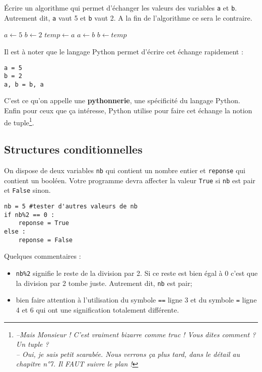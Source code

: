\begin{cor}
\begin{multicols}{2}
Écrire un algorithme qui permet d'échanger les valeurs des variables \texttt{a} et \texttt{b}.\\
Autrement dit, \texttt{a} vaut 5 et \texttt{b} vaut 2. A la fin de l'algorithme ce sera le contraire.\\

\columnbreak
\begin{algorithm}[H]
$a \leftarrow 5$ \;
$b \leftarrow 2$ \;
$temp \leftarrow a$ \;
$a \leftarrow b$ \;
$b \leftarrow temp$ \;
\end{algorithm}
\end{multicols}
Il est à noter que le langage Python permet d'écrire cet échange rapidement :
\begin{lstlisting}
a = 5
b = 2
a, b = b, a
\end{lstlisting}
C'est ce qu'on appelle une \textbf{pythonnerie}, une spécificité du langage Python. Enfin pour ceux que ça intéresse, Python utilise pour faire cet échange la notion de tuple\footnote{\textit{--Mais Monsieur ! C'est vraiment bizarre comme truc ! Vous dites comment ? Un tuple ?\\ -- Oui, je sais petit scarabée. Nous verrons ça plus tard, dans le détail au chapitre n°7. Il FAUT suivre le plan !}}. 
\end{cor}




\subsection{Structures conditionnelles}
\begin{cor}[Python]
\begin{multicols}{2}
On dispose de deux variables \texttt{nb} qui contient un nombre entier et \texttt{reponse} qui contient un booléen. Votre programme devra affecter la valeur \texttt{True} si \texttt{nb} est pair et \texttt{False} sinon.
\columnbreak
\begin{lstlisting}
nb = 5 #tester d'autres valeurs de nb
if nb%2 == 0 :
	reponse = True
else :
	reponse = False
\end{lstlisting}
\end{multicols}
\noindent Quelques commentaires :
\begin{itemize}
	\item \texttt{nb\%2} signifie \og le reste de la division par 2\fg. Si ce reste est bien égal à 0 c'est que la division par 2 tombe juste. Autrement dit, \texttt{nb} est pair;
	\item bien faire attention à l'utilisation du symbole \texttt{==} ligne 3 et du symbole \texttt{=} ligne 4 et 6 qui ont une signification totalement différente.
\end{itemize}
\end{cor}

